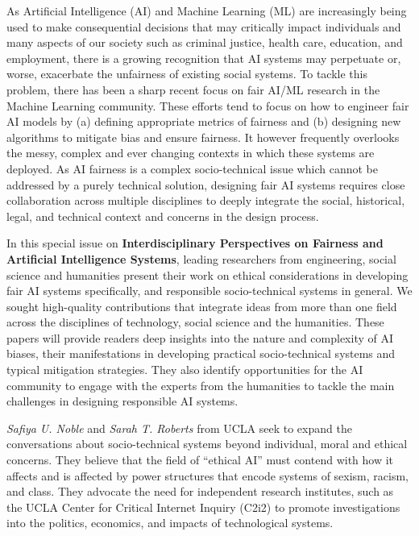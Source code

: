 \documentclass[11pt]{article}
\begin{document}
As Artificial Intelligence (AI) and Machine Learning (ML) are increasingly being used to make consequential  decisions that may critically impact individuals and many aspects of our society such as criminal justice, health care, education, and employment, there is a  growing recognition that AI systems may perpetuate or, worse, exacerbate the unfairness of existing social systems.  To tackle this problem, there has been a sharp recent focus on fair AI/ML research in the Machine Learning community.  These efforts tend to focus on how to engineer fair AI models by (a) defining appropriate metrics of fairness and (b) designing new algorithms to mitigate bias and ensure fairness. It however frequently overlooks the messy, complex and ever changing  contexts in which these systems are deployed. As AI fairness is a complex socio-technical issue which cannot be addressed by a purely technical solution,  designing fair AI systems requires close collaboration across multiple disciplines to  deeply integrate the social, historical, legal, and technical context and concerns in the design process.  

In this special issue on \textbf{Interdisciplinary Perspectives on Fairness and Artificial Intelligence Systems}, leading researchers from  engineering, social science and humanities present their work on ethical considerations in developing fair AI systems specifically, and responsible socio-technical systems in general. We sought high-quality contributions that integrate ideas from more than one field across the disciplines of technology, social science and the humanities. These papers will provide readers deep insights into the nature and complexity of AI biases, their manifestations in developing practical socio-technical systems and typical mitigation strategies.  They also identify  opportunities for the AI community to engage with the experts from the  humanities to tackle the main challenges in designing responsible AI  systems.  

\textit{Safiya U. Noble} and \textit{Sarah T. Roberts} from UCLA seek to expand the conversations about socio-technical systems beyond individual, moral and ethical concerns. They believe that the field of “ethical AI” must contend with how it affects and is affected by power structures that encode systems of sexism, racism, and class. They advocate the need for independent research institutes, such as the UCLA Center for Critical Internet Inquiry (C2i2) to promote investigations into the politics, economics, and impacts of technological systems. %
\end{document}
